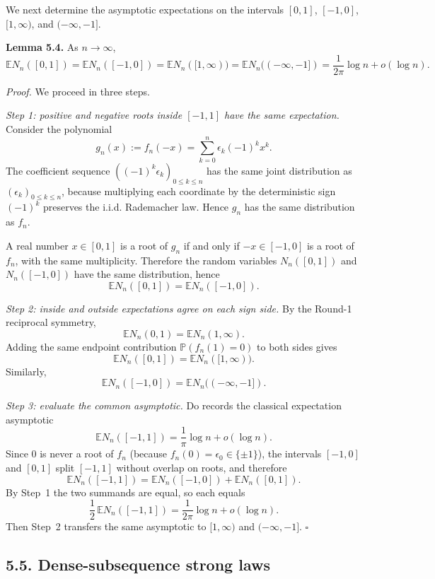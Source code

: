 We next determine the asymptotic expectations on the intervals $[0,1]$, $[-1,0]$, $[1,\infty)$, and $(-\infty,-1]$.

\medskip
\noindent\textbf{Lemma 5.4.}
As $n\to\infty$,
\[
\mathbb E N_n([0,1])
=\mathbb E N_n([-1,0])
=\mathbb E N_n([1,\infty))
=\mathbb E N_n((-\infty,-1])
=\frac{1}{2\pi}\log n+o(\log n).
\]

\medskip
\noindent\emph{Proof.}
We proceed in three steps.

\smallskip
\noindent\emph{Step 1: positive and negative roots inside $[-1,1]$ have the same expectation.}
Consider the polynomial
\[
g_n(x):=f_n(-x)=\sum_{k=0}^n \epsilon_k(-1)^k x^k.
\]
The coefficient sequence $((-1)^k\epsilon_k)_{0\le k\le n}$ has the same joint distribution as $(\epsilon_k)_{0\le k\le n}$, because multiplying each coordinate by the deterministic sign $(-1)^k$ preserves the i.i.d. Rademacher law. Hence $g_n$ has the same distribution as $f_n$.

A real number $x\in[0,1]$ is a root of $g_n$ if and only if $-x\in[-1,0]$ is a root of $f_n$, with the same multiplicity. Therefore the random variables $N_n([0,1])$ and $N_n([-1,0])$ have the same distribution, hence
\[
\mathbb E N_n([0,1])=\mathbb E N_n([-1,0]).
\]

\smallskip
\noindent\emph{Step 2: inside and outside expectations agree on each sign side.}
By the Round-1 reciprocal symmetry,
\[
\mathbb E N_n(0,1)=\mathbb E N_n(1,\infty).
\]
Adding the same endpoint contribution $\mathbb P(f_n(1)=0)$ to both sides gives
\[
\mathbb E N_n([0,1])=\mathbb E N_n([1,\infty)).
\]
Similarly,
\[
\mathbb E N_n([-1,0])=\mathbb E N_n((-\infty,-1]).
\]

\smallskip
\noindent\emph{Step 3: evaluate the common asymptotic.}
Do records the classical expectation asymptotic
\[
\mathbb E N_n([-1,1])=\frac{1}{\pi}\log n+o(\log n).
\]
Since $0$ is never a root of $f_n$ (because $f_n(0)=\epsilon_0\in\{\pm1\}$), the intervals $[-1,0]$ and $[0,1]$ split $[-1,1]$ without overlap on roots, and therefore
\[
\mathbb E N_n([-1,1])=\mathbb E N_n([-1,0])+\mathbb E N_n([0,1]).
\]
By Step~1 the two summands are equal, so each equals
\[
\frac12\,\mathbb E N_n([-1,1])
=\frac{1}{2\pi}\log n+o(\log n).
\]
Then Step~2 transfers the same asymptotic to $[1,\infty)$ and $(-\infty,-1]$.
\hfill$\square$

\subsection*{5.5. Dense-subsequence strong laws}

